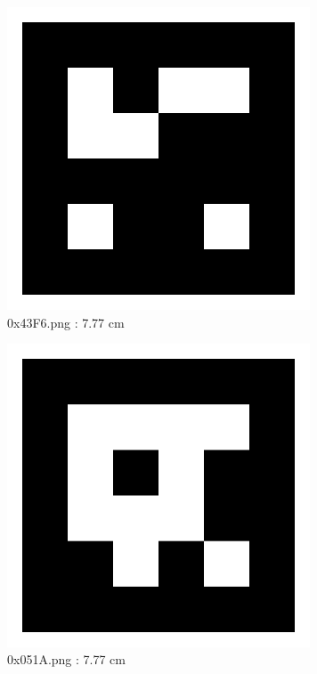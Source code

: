 \documentclass[11pt,a4,BCOR=0cm]{scrartcl}
\begin{document}
\begin{figure}
  \centering
    \includegraphics[natwidth=400,natheight=400,width=9cm]{0x43F6.png}
    \caption{0x43F6.png : 7.77 cm}
    \label{fig:0x43F6.png}
  
\end{figure} 

\clearpage

\begin{figure}
  \centering
    \includegraphics[natwidth=400,natheight=400,width=9cm]{0x051A.png}
    \caption{0x051A.png : 7.77 cm}
    \label{fig:0x051A.png}
  
\end{figure} 
\end{document}
